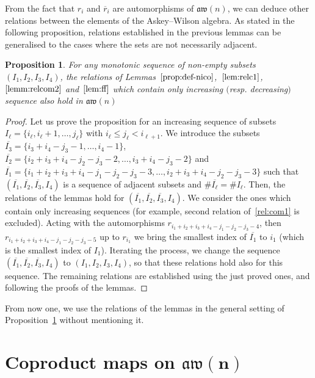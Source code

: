 \documentclass[10pt,a4paper]{amsart}
\numberwithin{equation}{section}
\newtheorem{prop}[theo]{Proposition}
\theoremstyle{definition}
\newcommand{\rb}{\overline{r}}
\newcommand{\aw}{\mathfrak{aw}(n)}
\begin{document}
From the fact that $r_i$ and $\rb_i$ are automorphisms of $\aw$, we can deduce other relations between the elements of the Askey--Wilson algebra.
As stated in the following proposition, relations established in the previous lemmas can be generalised to the cases where the sets are not necessarily adjacent.
\begin{prop}\label{prop:gen}
 For any monotonic sequence of non-empty subsets $(I_1,I_2,I_3,I_4)$, the relations of Lemmas~$\ref{prop:def-nico}$,~$\ref{lem:relc1}$,~$\ref{lemm:relcom2}$ and~$\ref{lem:ff}$
 which contain only increasing $($resp. decreasing$)$ sequence also hold in $\aw$
\end{prop}
\begin{proof}
Let us prove the proposition for an increasing sequence of subsets $I_\ell=\{i_\ell,i_\ell+1,\dots ,j_\ell\}$ with $i_\ell\leq j_\ell< i_{\ell+1}$.
We introduce the subsets $\overline{I_3}=\{i_3+i_4-j_3-1, \dots ,i_4-1\}$, $\overline{I_2}=\{i_2+i_3+i_4-j_2-j_3-2,\dots, i_3+i_4-j_3-2\}$ and $\overline{I_1}=\{i_1+i_2+i_3+i_4-j_1-j_2-j_3-3,\dots ,i_2+i_3+i_4-j_2-j_3-3\}$ such that
$(\overline{I_1},\overline{I_2},\overline{I_3},I_4)$ is a sequence of adjacent subsets and $\# \overline{I_\ell}=\# I_\ell$.
Then, the relations of the lemmas hold for $(\overline{I_1},\overline{I_2},\overline{I_3},I_4)$.
We consider the ones which contain only increasing sequences (for example, second relation of~\eqref{rel:com1} is excluded).
Acting with the automorphisms $r_{i_1+i_2+i_3+i_4-j_1-j_2-j_3-4}$, then $r_{i_1+i_2+i_3+i_4-j_1-j_2-j_3-5}$ up to $r_{i_1}$ we bring the smallest index of $\overline{I_1}$ to $i_1$ (which is the smallest index of $I_1$). Iterating the process, we change the sequence $(\overline{I_1},\overline{I_2},\overline{I_3},I_4)$ to $(I_1,I_2,I_3,I_4)$, so that these relations hold also
for this sequence. The remaining relations are established
 using the just proved ones, and following the proofs of the lemmas.
\end{proof}


From now one, we use the relations of the lemmas in the general setting of Proposition~\ref{prop:gen} without mentioning it.



\section[Coproduct maps on aw(n)]{Coproduct maps on $\boldsymbol{\aw}$}\label{sec-coproduct}
\end{document}
